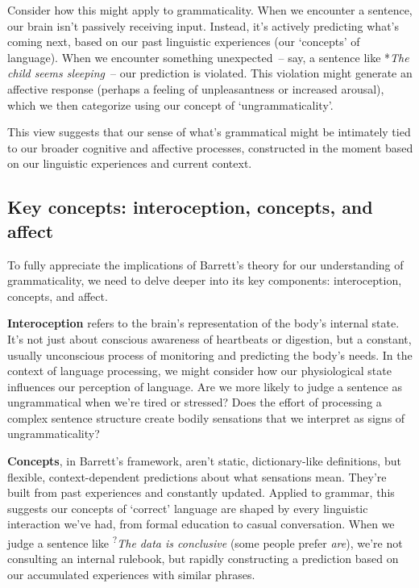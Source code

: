 Consider how this might apply to grammaticality. When we encounter a sentence, our brain isn't passively receiving input. Instead, it's actively predicting what's coming next, based on our past linguistic experiences (our `concepts' of language). When we encounter something unexpected~-- say, a sentence like *\textit{The child seems sleeping}~-- our prediction is violated. This violation might generate an affective response (perhaps a feeling of unpleasantness or increased arousal), which we then categorize using our concept of `ungrammaticality'.

This view suggests that our sense of what's grammatical might be intimately tied to our broader cognitive and affective processes, constructed in the moment based on our linguistic experiences and current context.

\subsection{Key concepts: interoception, concepts, and affect}

To fully appreciate the implications of Barrett's theory for our understanding of grammaticality, we need to delve deeper into its key components: interoception, concepts, and affect.

\textbf{Interoception} refers to the brain's representation of the body's internal state. It's not just about conscious awareness of heartbeats or digestion, but a constant, usually unconscious process of monitoring and predicting the body's needs. In the context of language processing, we might consider how our physiological state influences our perception of language. Are we more likely to judge a sentence as ungrammatical when we're tired or stressed? Does the effort of processing a complex sentence structure create bodily sensations that we interpret as signs of ungrammaticality?

\textbf{Concepts}, in Barrett's framework, aren't static, dictionary-like definitions, but flexible, context-dependent predictions about what sensations mean. They're built from past experiences and constantly updated. Applied to grammar, this suggests our concepts of `correct' language are shaped by every linguistic interaction we've had, from formal education to casual conversation. When we judge a sentence like \textsuperscript{?}{\textit{The data is conclusive}} (some people prefer \textit{are}), we're not consulting an internal rulebook, but rapidly constructing a prediction based on our accumulated experiences with similar phrases.

